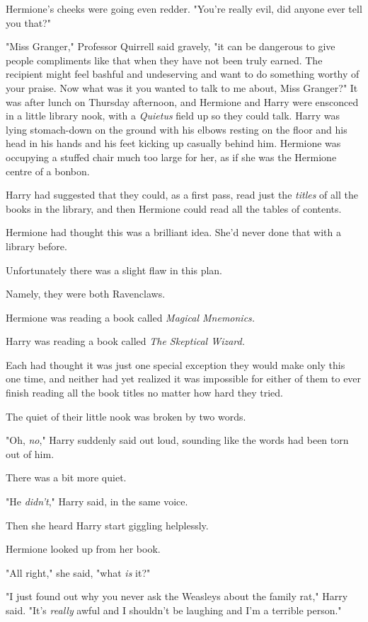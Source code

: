 Hermione's cheeks were going even redder. "You're really evil, did anyone ever
tell you that?"

"Miss Granger," Professor Quirrell said gravely, "it can be dangerous to give
people compliments like that when they have not been truly earned. The
recipient might feel bashful and undeserving and want to do something worthy of
your praise. Now what was it you wanted to talk to me about, Miss Granger?"
\later
It was after lunch on Thursday afternoon, and Hermione and Harry were ensconced
in a little library nook, with a \emph{Quietus} field up so they could talk.
Harry was lying stomach-down on the ground with his elbows resting on the floor
and his head in his hands and his feet kicking up casually behind him. Hermione
was occupying a stuffed chair much too large for her, as if she was the Hermione
centre of a bonbon.

Harry had suggested that they could, as a first pass, read just the
\emph{titles} of all the books in the library, and then Hermione could read all
the tables of contents.

Hermione had thought this was a brilliant idea. She'd never done that with a
library before.

Unfortunately there was a slight flaw in this plan.

Namely, they were both Ravenclaws.

Hermione was reading a book called \emph{Magical Mnemonics.}

Harry was reading a book called \emph{The Skeptical Wizard.}

Each had thought it was just one special exception they would make only this
one time, and neither had yet realized it was impossible for either of them to
ever finish reading all the book titles no matter how hard they tried.

The quiet of their little nook was broken by two words.

"Oh, \emph{no}," Harry suddenly said out loud, sounding like the words had been
torn out of him.

There was a bit more quiet.

"He \emph{didn't}," Harry said, in the same voice.

Then she heard Harry start giggling helplessly.

Hermione looked up from her book.

"All right," she said, "what \emph{is} it?"

"I just found out why you never ask the Weasleys about the family rat," Harry
said. "It's \emph{really} awful and I shouldn't be laughing and I'm a terrible
person."

